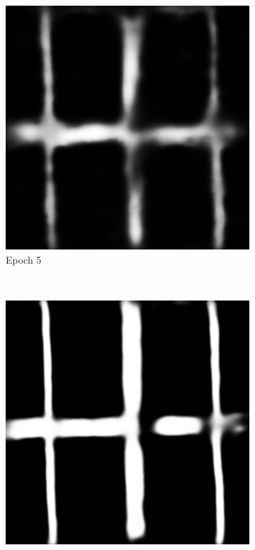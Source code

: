 \documentclass[10pt,conference,compsocconf]{IEEEtran}
\begin{document}
\begin{figure}[!h]
 	\begin{subfigure}[b]{0.12\textwidth}
 		\includegraphics[width=\textwidth]{ep5.png}
 		\caption{Epoch 5}
 	\end{subfigure}
 	~ %
 	\begin{subfigure}[b]{0.12\textwidth}
 		\includegraphics[width=\textwidth]{ep29.png}

\end{subfigure}
\end{figure}
\end{document}
